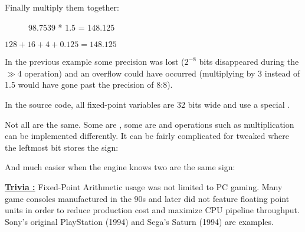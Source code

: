 Finally multiply them together:

\begin{figure}[H]
 \centering
   
   \caption{98.7539 * 1.5 = 148.125} 
\end{figure} 
$128 + 16 + 4 + 0.125 = 148.125 $\\
\par
In the previous example some precision was lost ($ 2^{-8}$ bits disappeared during the $\gg 4$ operation) and an overflow could have occurred (multiplying by 3 instead of 1.5 would have gone past the precision of 8:8).\\
\par
In the source code, all fixed-point variables are 32 bits wide and use a special .\\
\par
\begin{minipage}{\textwidth}
 
 \end{minipage}
\par
Not all  are the same. Some are , some are  and operations such as multiplication can be implemented differently. It can be fairly complicated for tweaked  where the leftmost bit stores the sign:\\
\par
\begin{minipage}{\textwidth}
 
 \end{minipage}
\par
\vspace{10pt}
And much easier when the engine knows two  are the same sign:\\

\par
\begin{minipage}{\textwidth}
 
 \end{minipage}
\par
\vspace{10pt}
 \textbf{\underline{Trivia :}}  Fixed-Point Arithmetic usage was not limited to PC gaming. Many game consoles manufactured in the 90s and later did not feature floating point units in order to reduce production cost and maximize CPU pipeline throughput. Sony's original PlayStation (1994) and Sega's Saturn (1994) are examples.
 

 
 


